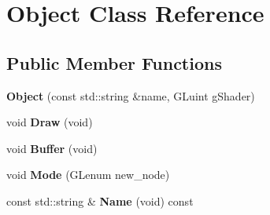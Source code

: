 \hypertarget{class_object}{\section{Object Class Reference}
\label{class_object}
}
\subsection*{Public Member Functions}
\begin{DoxyCompactItemize}
\item 
\hypertarget{class_object_aacf42e81415f32f1f2a105ce29c7c1b9}{{\bfseries Object} (const std\-::string \&name, G\-Luint g\-Shader)}\label{class_object_aacf42e81415f32f1f2a105ce29c7c1b9}

\item 
\hypertarget{class_object_a3afa1b9af32b78d81b5de0836c511aeb}{void {\bfseries Draw} (void)}\label{class_object_a3afa1b9af32b78d81b5de0836c511aeb}

\item 
\hypertarget{class_object_a35c89a8eb8a5b742a9025331119bfc7c}{void {\bfseries Buffer} (void)}\label{class_object_a35c89a8eb8a5b742a9025331119bfc7c}

\item 
\hypertarget{class_object_ac6ccf69d21c4c902c62829c48ef6cf5b}{void {\bfseries Mode} (G\-Lenum new\-\_\-node)}\label{class_object_ac6ccf69d21c4c902c62829c48ef6cf5b}

\item 
\hypertarget{class_object_a890760dff9df547454112ff84510040c}{const std\-::string \& {\bfseries Name} (void) const }\label{class_object_a890760dff9df547454112ff84510040c}

\end{DoxyCompactItemize}
